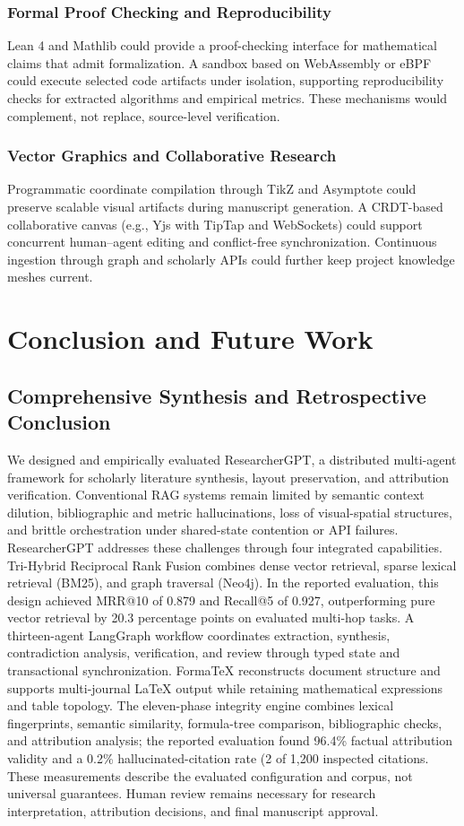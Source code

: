 \documentclass[conference]{IEEEtran}
\begin{document}
\subsubsection{Formal Proof Checking and Reproducibility}
Lean 4 and Mathlib could provide a proof-checking interface for mathematical claims that admit formalization. A sandbox based on WebAssembly or eBPF could execute selected code artifacts under isolation, supporting reproducibility checks for extracted algorithms and empirical metrics. These mechanisms would complement, not replace, source-level verification.
\subsubsection{Vector Graphics and Collaborative Research}
Programmatic coordinate compilation through TikZ and Asymptote could preserve scalable visual artifacts during manuscript generation. A CRDT-based collaborative canvas (e.g., Yjs with TipTap and WebSockets) could support concurrent human--agent editing and conflict-free synchronization. Continuous ingestion through graph and scholarly APIs could further keep project knowledge meshes current.
\section{Conclusion and Future Work}
\label{sec:conclusion}
\subsection{Comprehensive Synthesis and Retrospective Conclusion}
We designed and empirically evaluated ResearcherGPT, a distributed multi-agent framework for scholarly literature synthesis, layout preservation, and attribution verification. Conventional RAG systems remain limited by semantic context dilution, bibliographic and metric hallucinations, loss of visual-spatial structures, and brittle orchestration under shared-state contention or API failures.
ResearcherGPT addresses these challenges through four integrated capabilities. Tri-Hybrid Reciprocal Rank Fusion combines dense vector retrieval, sparse lexical retrieval (BM25), and graph traversal (Neo4j). In the reported evaluation, this design achieved MRR@10 of 0.879 and Recall@5 of 0.927, outperforming pure vector retrieval by 20.3 percentage points on evaluated multi-hop tasks. A thirteen-agent LangGraph workflow coordinates extraction, synthesis, contradiction analysis, verification, and review through typed state and transactional synchronization. FormaTeX reconstructs document structure and supports multi-journal LaTeX output while retaining mathematical expressions and table topology. The eleven-phase integrity engine combines lexical fingerprints, semantic similarity, formula-tree comparison, bibliographic checks, and attribution analysis; the reported evaluation found 96.4\% factual attribution validity and a 0.2\% hallucinated-citation rate (2 of 1,200 inspected citations.
These measurements describe the evaluated configuration and corpus, not universal guarantees. Human review remains necessary for research interpretation, attribution decisions, and final manuscript approval.
\end{document}
